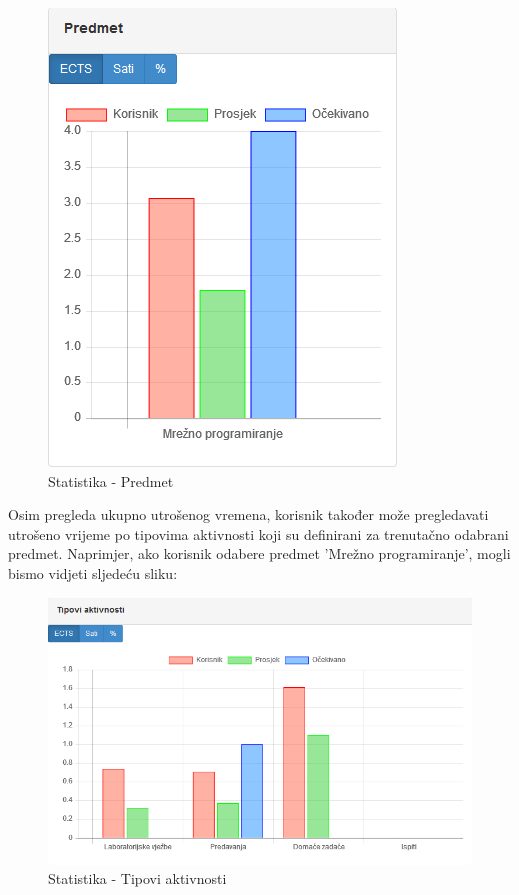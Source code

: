 \documentclass[times, utf8, zavrsni]{fer}
\begin{document}
\begin{figure}[H]
\centering
\includegraphics{img/statistika-predmet.png}
\caption{Statistika - Predmet}
\label{fig:statistika-predmet}
\end{figure}

Osim pregleda ukupno utrošenog vremena, korisnik također može pregledavati utrošeno vrijeme po tipovima aktivnosti koji su definirani za trenutačno odabrani predmet. Naprimjer, ako korisnik odabere predmet 'Mrežno programiranje', mogli bismo vidjeti sljedeću sliku:

\begin{figure}[H]
\centering
\includegraphics[width=\textwidth,height=\textheight,keepaspectratio]{img/statistika-tip-aktivnosti.png}
\caption{Statistika - Tipovi aktivnosti}
\label{fig:statistika-tip-aktivnosti}
\end{figure}
\end{document}
